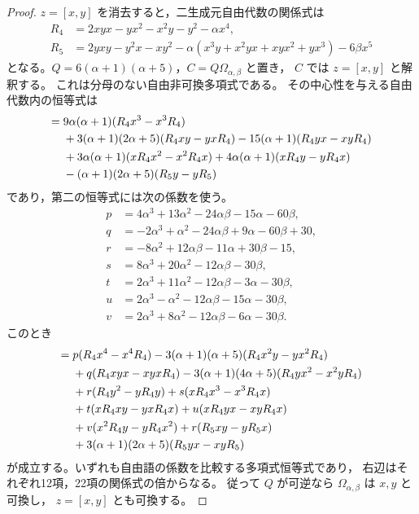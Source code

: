 \begin{proof}
$z=[x,y]$ を消去すると，二生成元自由代数の関係式は
\begin{align*}
 R_4&=2xyx-yx^2-x^2y-y^2-\alpha x^4,\\
 R_5&=2yxy-y^2x-xy^2
       -\alpha(x^3y+x^2yx+xyx^2+yx^3)-6\beta x^5
\end{align*}
となる。$Q=6(\alpha+1)(\alpha+5)$，$C=Q\Omega_{\alpha,\beta}$ と置き，
$C$ では $z=[x,y]$ と解釈する。
これは分母のない自由非可換多項式である。
その中心性を与える自由代数内の恒等式は
\begin{align}
[C,x]={}&9\alpha(\alpha+1)(R_4x^3-x^3R_4)\notag\\
 &+3(\alpha+1)(2\alpha+5)(R_4xy-yxR_4)
       -15(\alpha+1)(R_4yx-xyR_4)\notag\\
 &+3\alpha(\alpha+1)(xR_4x^2-x^2R_4x)
       +4\alpha(\alpha+1)(xR_4y-yR_4x)\notag\\
 &-(\alpha+1)(2\alpha+5)(R_5y-yR_5)
       \label{eq:degree-one-shadow-top-x-certificate}
\end{align}
であり，第二の恒等式には次の係数を使う。
\begin{align*}
 p&=4\alpha^3+13\alpha^2-24\alpha\beta-15\alpha-60\beta,\\
 q&=-2\alpha^3+\alpha^2-24\alpha\beta+9\alpha-60\beta+30,\\
 r&=-8\alpha^2+12\alpha\beta-11\alpha+30\beta-15,\\
 s&=8\alpha^3+20\alpha^2-12\alpha\beta-30\beta,\\
 t&=2\alpha^3+11\alpha^2-12\alpha\beta-3\alpha-30\beta,\\
 u&=2\alpha^3-\alpha^2-12\alpha\beta-15\alpha-30\beta,\\
 v&=2\alpha^3+8\alpha^2-12\alpha\beta-6\alpha-30\beta.
\end{align*}
このとき
\begin{align}
[C,y]={}&p(R_4x^4-x^4R_4)
       -3(\alpha+1)(\alpha+5)(R_4x^2y-yx^2R_4)\notag\\
 &+q(R_4xyx-xyxR_4)
       -3(\alpha+1)(4\alpha+5)(R_4yx^2-x^2yR_4)\notag\\
 &+r(R_4y^2-yR_4y)+s(xR_4x^3-x^3R_4x)\notag\\
 &+t(xR_4xy-yxR_4x)+u(xR_4yx-xyR_4x)\notag\\
 &+v(x^2R_4y-yR_4x^2)+r(R_5xy-yR_5x)\notag\\
 &+3(\alpha+1)(2\alpha+5)(R_5yx-xyR_5)
       \label{eq:degree-one-shadow-top-y-certificate}
\end{align}
が成立する。いずれも自由語の係数を比較する多項式恒等式であり，
右辺はそれぞれ12項，22項の関係式の倍からなる。
従って $Q$ が可逆なら $\Omega_{\alpha,\beta}$ は $x,y$ と可換し，
$z=[x,y]$ とも可換する。


\end{proof}
